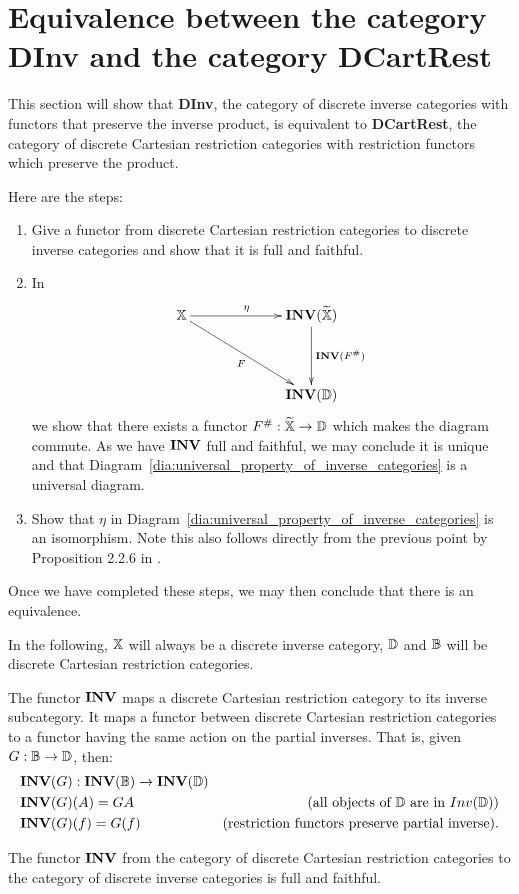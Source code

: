 \section{Equivalence between the category  {\bf DInv} and the category {\bf DCartRest}} %
\label{sec:equivalence_of_categories}

This section will show that {\bf DInv}, the category of discrete inverse categories with functors
that preserve the inverse product, is equivalent to {\bf DCartRest}, the category of discrete
Cartesian restriction categories with restriction functors which preserve the product.

Here are the steps:
\begin{enumerate}
\item Give a functor \Invf from discrete Cartesian restriction categories to discrete inverse
  categories and show that it is full and faithful.
\item In
  \begin{equation}
    \xymatrix @C=65pt @R=40pt{
      \X \ar[r]^{\eta} \ar[rd]_{F}& \Inv{\Xt} \ar[d]^{\Inv{F^{\#}}}\\
      &\Inv{\D}
    }
    \label{dia:universal_property_of_inverse_categories}
  \end{equation}
  we show that there exists a functor $F^{\#}:\widetilde{\mathbb{X}} \to \mathbb{D}$ which makes the diagram commute. As we
  have $\mathbf{INV}$ full and faithful, we may conclude it is unique and that
  Diagram~\ref{dia:universal_property_of_inverse_categories} is a universal diagram.
\item Show that $\eta$ in Diagram~\ref{dia:universal_property_of_inverse_categories} is an
  isomorphism. Note this also follows directly from the previous point by Proposition 2.2.6 in
  \cite{cockett2009:ctcs}.
\end{enumerate}
Once we have completed these steps, we may then conclude that there is an equivalence.

In the following, $\mathbb{X}$ will always be a discrete inverse category, $\mathbb{D}$ and $\mathbb{B}$ will be discrete
Cartesian restriction categories.

The functor $\mathbf{INV}$ maps a discrete Cartesian restriction category to its inverse subcategory. It
maps a functor between discrete Cartesian restriction categories to a functor having the same action
on the partial inverses. That is, given $G:\mathbb{B} \to \mathbb{D}$, then:
\begin{align*}
  &\mathbf{INV}({G}): \mathbf{INV}({\mathbb{B}}) \to \mathbf{INV}({\mathbb{D}})\\
  &\mathbf{INV}({G})(A) = G{A}&\text{(all objects of $\mathbb{D}$ are in $Inv(\mathbb{D})$)}\\
  &\mathbf{INV}({G})(f) = G(f)&\text{(restriction functors preserve partial inverse)}.
\end{align*}
\begin{lemma}\label{lem:inv_is_full_and_faithful}
  The functor $\mathbf{INV}$ from the category of discrete Cartesian restriction categories to the category
  of discrete inverse categories is full and faithful.
\end{lemma}


